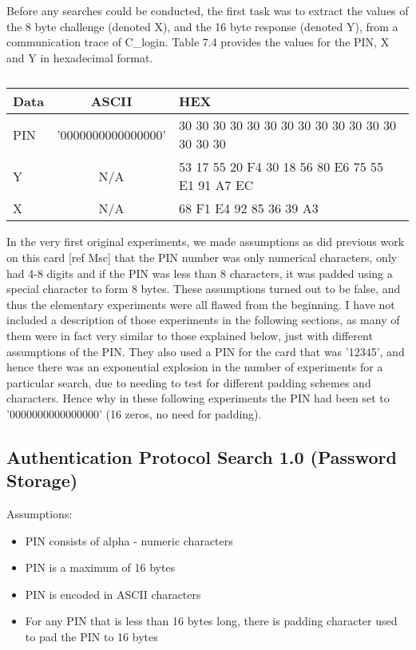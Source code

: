 \documentclass[bsc,frontabs,twoside,singlespacing,parskip,deptreport]{infthesis}     %
\begin{document}
\newpage


\noindent Before any searches could be conducted, the first task was to extract the values of the 8 byte challenge (denoted X), and the 16 byte response (denoted Y), from a communication trace of C\_login. Table 7.4 provides the values for the PIN, X and Y in hexadecimal format.\\

 
\begin{table}[H]
\begin{center}  
\begin{tabular}{|l|c|l|}
\hline
Data & ASCII & HEX\\
\hline
PIN & '0000000000000000' & 30 30 30 30 30 30 30 30 30 30 30 30 30 30 30 30\\
\hline
Y & N/A & 53 17 55 20 F4 30 18 56 80 E6 75 55 E1 91 A7 EC\\
\hline
X & N/A & 68 F1 E4 92 85 36 39 A3\\
\hline
\end{tabular}
\end{center}
\caption{}
\end{table}


In the very first original experiments, we made assumptions as did previous work on this card [ref Msc] that the PIN number was only numerical characters, only had 4-8 digits and if the PIN was less than 8 characters, it was padded using a special character to form 8 bytes. These assumptions turned out to be false, and thus the elementary experiments were all flawed from the beginning. I have not included a description of those experiments in the following sections, as many of them were in fact very similar to those explained below, just with different assumptions of the PIN. They also used a PIN for the card that was '12345', and hence there was an exponential explosion in the number of experiments for a particular search, due to needing to test for different padding schemes and characters. Hence why in these following experiments the PIN had been set to '0000000000000000' (16 zeros, no need for padding).




\subsection{Authentication Protocol Search 1.0 (Password Storage)}
Assumptions:\\
\begin{itemize}
\item PIN consists of alpha - numeric characters
\item PIN is a maximum of 16 bytes
\item PIN is encoded in ASCII characters
\item For any PIN that is less than 16 bytes long, there is padding character used to pad the PIN to 16 bytes\\
\end{itemize}
\end{document}
